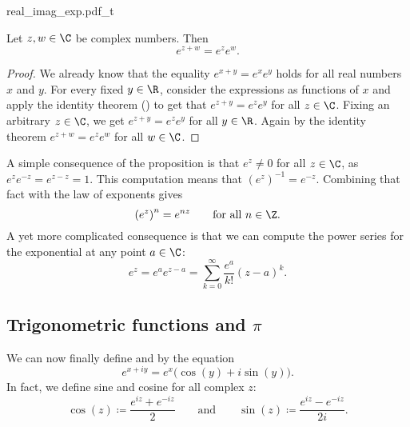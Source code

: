 \begin{myfigureht}
{real_imag_exp.pdf_t}
\caption{Graphs of the real part (left) and imaginary part (right)
of the complex exponential $e^z = e^{x+iy}$.  The $x$-axis goes from $-4$ to
$4$, the $y$-axis goes from $-6$ to $6$, and the vertical axis goes from
$-e^{4} \approx -54.6$
to
$e^{4} \approx 54.6$.  The plot of the real exponential ($y=0$)
is marked in a bold line.\label{fig:complexexpgraphs}}
\end{myfigureht}

\begin{prop}
Let $z,w \in \C$ be complex numbers.  Then
\begin{equation*}
e^{z+w} = e^z e^w.
\end{equation*}
\end{prop}

\begin{proof}
We already know that
the equality
$e^{x+y} = e^x e^y$ holds for all
real numbers $x$ and $y$.
For every fixed $y \in \R$, consider the expressions as
functions of $x$ and apply the identity theorem
() to get that
$e^{z+y} = e^ze^y$ for all $z \in \C$.  Fixing an arbitrary $z \in \C$,
we get
$e^{z+y} = e^ze^y$ for all $y \in \R$.  Again by the identity theorem 
$e^{z+w} = e^z e^w$
for all $w \in \C$.
\end{proof}

A simple consequence of the proposition is that $e^z\not=0$ for all $z \in \C$,
as $e^z e^{-z} = e^{z-z} = 1$.
This computation means that ${(e^z)}^{-1} = e^{-z}$.
Combining that fact with the law of exponents gives
\begin{equation*}
{(e^z)}^{n} = e^{nz} \qquad \text{for all } n \in \Z.
\end{equation*}
A yet more complicated consequence is that we
can compute the power series for the exponential at any point $a \in
\C$:
\begin{equation*}
e^z = e^a e^{z-a} = \sum_{k=0}^\infty \frac{e^a}{k!} {(z-a)}^k .
\end{equation*}

\subsection{Trigonometric functions and $\pi$}

We can now finally define \emph{} and \emph{}
by the equation
\begin{equation*}
e^{x+iy} = e^x \bigl( \cos(y) + i \sin(y) \bigr) .
\end{equation*}
In fact, we define sine and cosine for all complex $z$:
\begin{equation*}
\cos(z) \coloneqq \frac{e^{iz} + e^{-iz}}{2}
\qquad\text{and}\qquad
\sin(z) \coloneqq \frac{e^{iz} - e^{-iz}}{2i} .
\end{equation*}


